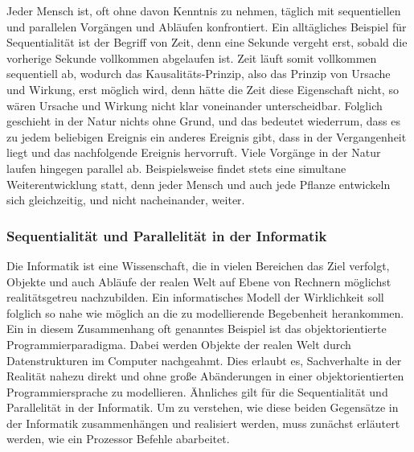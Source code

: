 				Jeder Mensch ist, oft ohne davon Kenntnis zu nehmen, täglich mit sequentiellen und parallelen Vorgängen und Abläufen konfrontiert. Ein alltägliches Beispiel für Sequentialität ist der Begriff von Zeit, denn eine Sekunde vergeht erst, sobald die vorherige Sekunde vollkommen abgelaufen ist. Zeit läuft somit vollkommen sequentiell ab, wodurch das Kausalitäts-Prinzip, also das Prinzip von Ursache und Wirkung, erst möglich wird, denn hätte die Zeit diese Eigenschaft nicht, so wären Ursache und Wirkung nicht klar voneinander unterscheidbar. Folglich geschieht in der Natur nichts ohne Grund, und das bedeutet wiederrum, dass es zu jedem beliebigen Ereignis ein anderes Ereignis gibt, dass in der Vergangenheit liegt und das nachfolgende Ereignis hervorruft. \cite{Kausalitaet} Viele Vorgänge in der Natur laufen hingegen parallel ab. Beispielsweise findet stets eine simultane Weiterentwicklung statt, denn jeder Mensch und auch jede Pflanze entwickeln sich gleichzeitig, und nicht nacheinander, weiter. \cite{ParaProgLoogen}
				
			\subsubsection{Sequentialität und Parallelität in der Informatik}
				\label{SequUndParaInformatik}
				
				Die Informatik ist eine Wissenschaft, die in vielen Bereichen das Ziel verfolgt, Objekte und auch Abläufe der realen Welt auf Ebene von Rechnern möglichst realitätsgetreu nachzubilden. Ein informatisches Modell der Wirklichkeit soll folglich so nahe wie möglich an die zu modellierende Begebenheit herankommen. Ein in diesem Zusammenhang oft genanntes Beispiel ist das objektorientierte Programmierparadigma. Dabei werden Objekte der realen Welt durch Datenstrukturen im Computer nachgeahmt. Dies erlaubt es, Sachverhalte in der Realität nahezu direkt und ohne große Abänderungen in einer objektorientierten Programmiersprache zu modellieren. \cite{Objektorientierung} Ähnliches gilt für die Sequentialität und Parallelität in der Informatik. Um zu verstehen, wie diese beiden Gegensätze in der Informatik zusammenhängen und realisiert werden, muss zunächst erläutert werden, wie ein Prozessor Befehle abarbeitet.
				

